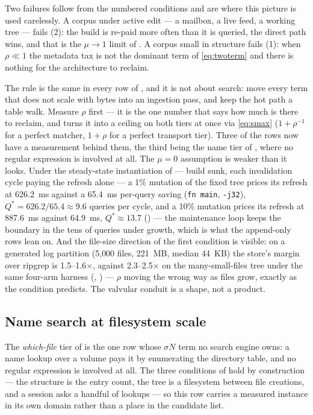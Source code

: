 \documentclass[11pt,letterpaper]{article}
\begin{document}
Two failures follow from the numbered conditions and are where this picture
is used carelessly. A corpus under active edit --- a mailbox, a live feed, a
working tree --- fails (2): the build is re-paid more often than it is
queried, the direct path wins, and that is the $\mu\to1$ limit of
. A corpus small in structure fails (1): when
$\rho\ll 1$ the metadata tax is not the dominant term of \eqref{eq:twoterm}
and there is nothing for the architecture to reclaim.

The rule is the same in every row of , and it is not about
search: move every term that does not scale with bytes into an ingestion
pass, and keep the hot path a table walk. Measure $\rho$ first --- it is the
one number that says how much is there to reclaim, and
 turns it into a ceiling on both tiers at once via
\eqref{eq:smax} ($1+\rho^{-1}$ for a perfect matcher, $1+\rho$ for a perfect
transport tier). Three of the rows now have a measurement behind them, the third being
the name tier of , where no regular expression is
involved at all. The
$\mu=0$ assumption is weaker than it looks. Under the steady-state
instantiation of  --- build sunk, each invalidation
cycle paying the refresh alone --- a 1\% mutation of the fixed tree prices
its refresh at 626.2~ms against a 65.4~ms per-query saving (\texttt{fn
main}, \texttt{-j32}), $Q^{*} = 626.2/65.4 \approx 9.6$ queries per cycle,
and a 10\% mutation prices its refresh at 887.6~ms against 64.9~ms,
$Q^{*} \approx 13.7$ () --- the
maintenance loop keeps the boundary in the tens of queries under growth,
which is what the append-only rows lean on. And the file-size direction of
the first condition is visible:
on a generated log partition (5{,}000 files, 221~MB, median 44~KB) the
store's margin over ripgrep is 1.5--1.6$\times$, against 2.3--2.5$\times$
on the many-small-files tree under the same four-arm harness
(,
)
--- $\rho$ moving the wrong way as files grow, exactly as the condition
predicts. The valvular conduit is a shape, not a product.

\subsection{Name search at filesystem scale}
\label{sec:uses:names}
The \emph{which-file} tier of  is the one row whose
$\sigma N$ term no search engine owns: a name lookup over a volume pays
it by enumerating the directory table, and no regular expression is
involved at all. The three conditions of  hold by
construction --- the structure is the entry count, the tree is a
filesystem between file creations, and a session asks a handful of
lookups --- so this row carries a measured instance in its own domain
rather than a place in the candidate list.
\end{document}
